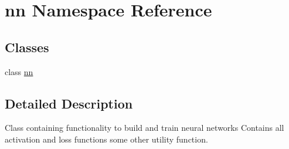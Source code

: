 \hypertarget{namespacenn}{}\section{nn Namespace Reference}
\label{namespacenn}
\subsection*{Classes}
\begin{DoxyCompactItemize}
\item 
class \hyperlink{classnn_1_1nn}{nn}
\end{DoxyCompactItemize}


\subsection{Detailed Description}
\begin{DoxyVerb}Class containing functionality to build and train neural networks
Contains all activation and loss functions some other utility function.
\end{DoxyVerb}
 